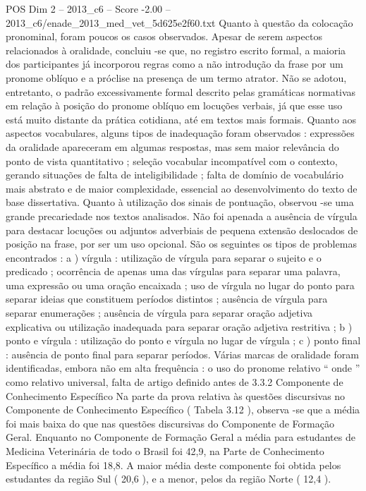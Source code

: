 \begin{textsample}{POS Dim 2 – 2013\_c6 – Score -2.00 – 2013\_c6/enade\_2013\_med\_vet\_5d625e2f60.txt}
Quanto à questão da colocação pronominal, foram poucos os casos observados.
Apesar de serem aspectos relacionados à oralidade, concluiu -se que, no registro escrito formal, a maioria dos participantes já incorporou regras como a não introdução da frase por um pronome oblíquo e a próclise na presença de um termo atrator.
Não se adotou, entretanto, o padrão excessivamente formal descrito pelas gramáticas normativas em relação à posição do pronome oblíquo em locuções verbais, já que esse uso está muito distante da prática cotidiana, até em textos mais formais.
Quanto aos aspectos vocabulares, alguns tipos de inadequação foram observados : expressões da oralidade apareceram em algumas respostas, mas sem maior relevância do ponto de vista quantitativo ; seleção vocabular incompatível com o contexto, gerando situações de falta de inteligibilidade ; falta de domínio de vocabulário mais abstrato e de maior complexidade, essencial ao desenvolvimento do texto de base dissertativa.
Quanto à utilização dos sinais de pontuação, observou -se uma grande precariedade nos textos analisados.
Não foi apenada a ausência de vírgula para destacar locuções ou adjuntos adverbiais de pequena extensão deslocados de posição na frase, por ser um uso opcional.
São os seguintes os tipos de problemas encontrados : a ) vírgula : utilização de vírgula para separar o sujeito e o predicado ; ocorrência de apenas uma das vírgulas para separar uma palavra, uma expressão ou uma oração encaixada ; uso de vírgula no lugar do ponto para separar ideias que constituem períodos distintos ; ausência de vírgula para separar enumerações ; ausência de vírgula para separar oração adjetiva explicativa ou utilização inadequada para separar oração adjetiva restritiva ; b ) ponto e vírgula : utilização do ponto e vírgula no lugar de vírgula ; c ) ponto final : ausência de ponto final para separar períodos.
Várias marcas de oralidade foram identificadas, embora não em alta frequência : o uso do pronome relativo “ onde ” como relativo universal, falta de artigo definido antes de 3.3.2 Componente de Conhecimento Específico Na parte da prova relativa às questões discursivas no Componente de Conhecimento Específico ( Tabela 3.12 ), observa -se que a média foi mais baixa do que nas questões discursivas do Componente de Formação Geral.
Enquanto no Componente de Formação Geral a média para estudantes de Medicina Veterinária de todo o Brasil foi 42,9, na Parte de Conhecimento Específico a média foi 18,8.
A maior média deste componente foi obtida pelos estudantes da região Sul ( 20,6 ), e a menor, pelos da região Norte ( 12,4 ).

\end{textsample}
